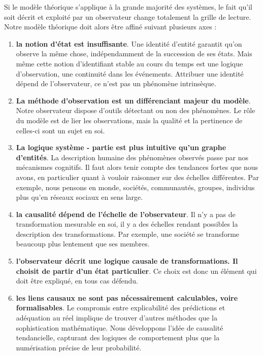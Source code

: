 \documentclass[11pt]{article}
\begin{document}
	\vspace{0.5cm}
	
	Si le modèle théorique s'applique à la grande majorité des systèmes, le fait qu'il soit décrit et exploité par un observateur change totalement la grille de lecture. Notre modèle théorique doit alors être affiné suivant plusieurs axes : 
	\begin{enumerate}
		\item \textbf{la notion d'état est insuffisante}. Une identité d'entité garantit qu'on observe la même chose, indépendamment de la succession de ses états. Mais même cette notion d'identifiant stable au cours du temps est une logique d'observation, une continuité dans les événements. Attribuer une identité dépend de l'observateur, ce n'est pas un phénomène intrinsèque. 
		\item \textbf{La méthode d'observation est un différenciant majeur du modèle}. Notre observateur dispose d'outils détectant ou non des phénomènes. Le rôle du modèle est de lier les observations, mais la qualité et la pertinence de celles-ci sont un sujet en soi. 
		\item \textbf{La logique système - partie est plus intuitive qu'un graphe d'entités}. La description humaine des phénomènes observés passe par nos mécanismes cognitifs. Il faut alors tenir compte des tendances fortes que nous avons, en particulier quant à vouloir raisonner sur des échelles différentes. Par exemple, nous pensons en monde, sociétés, communautés, groupes, individus plus qu'en réseaux sociaux en sens large. 
		\item \textbf{la causalité dépend de l'échelle de l'observateur}. Il n'y a pas de transformation mesurable en soi, il y a des échelles rendant possibles la description des transformations. Par exemple, une société se transforme beaucoup plus lentement que ses membres. 
		\item \textbf{l'observateur décrit une logique causale de transformations. Il choisit de partir d'un état particulier}. Ce choix est donc un élément qui doit être expliqué, en tous cas défendu. 
		\item \textbf{les liens causaux ne sont pas nécessairement calculables, voire formalisables}. Le compromis entre explicabilité des prédictions et adéquation au réel implique de trouver d'autres méthodes que la sophistication mathématique. Nous développons l'idée de causalité tendancielle, capturant des logiques de comportement plus que la numérisation précise de leur probabilité. 
	\end{enumerate}
	
\end{document}

